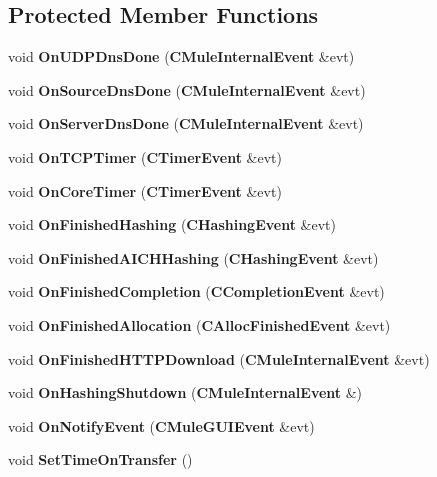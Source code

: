 \subsection*{Protected Member Functions}
\begin{DoxyCompactItemize}
\item 
void {\bfseries OnUDPDnsDone} ({\bf CMuleInternalEvent} \&evt)\label{classCamuleApp_ad39271142a01f1f872dbe178cc442cd1}

\item 
void {\bfseries OnSourceDnsDone} ({\bf CMuleInternalEvent} \&evt)\label{classCamuleApp_a48debcbc4ca4edbf22440caf29c5262a}

\item 
void {\bfseries OnServerDnsDone} ({\bf CMuleInternalEvent} \&evt)\label{classCamuleApp_a76ad96cc1f3737239d2056b7e23c9b37}

\item 
void {\bfseries OnTCPTimer} ({\bf CTimerEvent} \&evt)\label{classCamuleApp_ab24b6594328680e1a5dbe98df8dc5719}

\item 
void {\bfseries OnCoreTimer} ({\bf CTimerEvent} \&evt)\label{classCamuleApp_a1149a9ba66319b4fc8fca1661e5b9dda}

\item 
void {\bfseries OnFinishedHashing} ({\bf CHashingEvent} \&evt)\label{classCamuleApp_aab33884f97bca67e434874d8781df539}

\item 
void {\bfseries OnFinishedAICHHashing} ({\bf CHashingEvent} \&evt)\label{classCamuleApp_af3518c1e08b296ca946796161b928230}

\item 
void {\bfseries OnFinishedCompletion} ({\bf CCompletionEvent} \&evt)\label{classCamuleApp_a8adf561e25c99e848134118a4b0cb103}

\item 
void {\bfseries OnFinishedAllocation} ({\bf CAllocFinishedEvent} \&evt)\label{classCamuleApp_a4ef10f63f51006b69873eab0a80d7326}

\item 
void {\bfseries OnFinishedHTTPDownload} ({\bf CMuleInternalEvent} \&evt)\label{classCamuleApp_a8b70b2a544dd0851d344bc86426353ca}

\item 
void {\bfseries OnHashingShutdown} ({\bf CMuleInternalEvent} \&)\label{classCamuleApp_a54740e7086e611ab33c40eea507e9181}

\item 
void {\bfseries OnNotifyEvent} ({\bf CMuleGUIEvent} \&evt)\label{classCamuleApp_afff5d17a240e9e2e7c598e7796a67c35}

\item 
void {\bfseries SetTimeOnTransfer} ()\label{classCamuleApp_a63b0a9168e2670f0d84664243d3a260b}

\end{DoxyCompactItemize}
